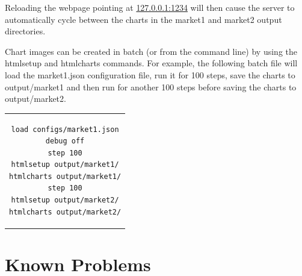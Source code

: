 \documentclass[10pt,oneside,openright, a4paper]{memoir}
\begin{document}
Reloading the webpage
pointing at \url{127.0.0.1:1234} will then cause the server to automatically
cycle between the charts in the market1 and market2 output directories.

Chart images can be created in batch (or from the command line) by using the
htmlsetup and htmlcharts commands. For example, the following batch
file will load the market1.json configuration file, run it for 100
steps, save the charts to output/market1 and then run for another 100
steps before saving the charts to output/market2. 

\begin{center}
\begin{tabular}{c}
\begin{lstlisting}
load configs/market1.json
debug off
step 100
htmlsetup output/market1/
htmlcharts output/market1/
step 100
htmlsetup output/market2/
htmlcharts output/market2/
\end{lstlisting}
\end{tabular}
\end{center}
%
%
\chapter{Known Problems}
\end{document}
